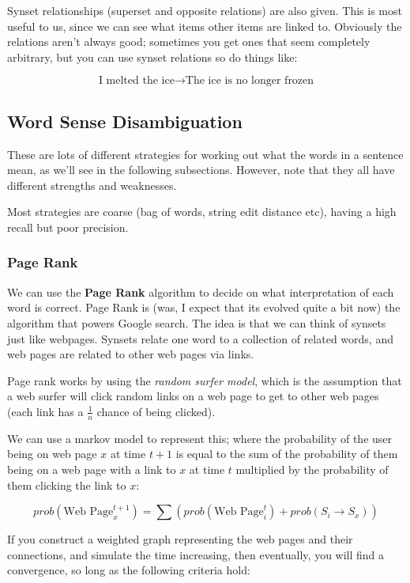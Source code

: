 Synset relationships (superset and opposite relations) are also given. This is
most useful to us, since we can see what items other items are linked to.
Obviously the relations aren't always good; sometimes you get ones that seem
completely arbitrary, but you can use synset relations so do things like:

\[
  \text{I melted the ice} \rightarrow \text{The ice is no longer frozen}
\] 

\subsection{Word Sense Disambiguation}

These are lots of different strategies for working out what the words in a
sentence mean, as we'll see in the following subsections. However, note that
they all have different strengths and weaknesses.

Most strategies are coarse (bag of words, string edit distance etc), having a high recall but poor precision.

\subsubsection{Page Rank}

We can use the \textbf{Page Rank} algorithm to decide on what interpretation of
each word is correct. Page Rank is (was, I expect that its evolved quite a bit
now) the algorithm that powers Google search. The idea is that we can think of
synsets just like webpages. Synsets relate one word to a collection of related
words, and web pages are related to other web pages via links.

Page rank works by using the \textit{random surfer model}, which is the
assumption that a web surfer will click random links on a web page to get to
other web pages (each link has a $\frac{1}{n}$ chance of being clicked).

We can use a markov model to represent this; where the probability of the user
being on web page $x$ at time $t + 1$ is equal to the sum of the probability of
them being on a web page with a link to $x$ at time $t$ multiplied by the
probability of them clicking the link to $x$:

\[
  prob(\text{Web Page}_x^{t + 1}) =
    \sum (prob(\text{Web Page}_i^t) + prob(S_i \rightarrow S_x))
\]

If you construct a weighted graph representing the web pages and their
connections, and simulate the time increasing, then eventually, you will find a
convergence, so long as the following criteria hold:

